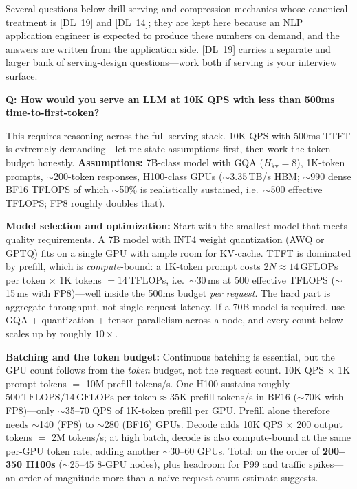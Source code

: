 Several questions below drill serving and compression mechanics whose canonical
treatment is [DL~19] and [DL~14]; they are kept here because an NLP application
engineer is expected to produce these numbers on demand, and the answers are written
from the application side.  [DL~19] carries a separate and larger bank of
serving-design questions---work both if serving is your interview surface.

\begin{interviewq}
\textbf{Q: How would you serve an LLM at 10K QPS with less than 500ms time-to-first-token?}

 \quad {} \quad \badgefreq{\freqhigh}

\stronganswer
This requires reasoning across the full serving stack.  10K QPS with 500ms TTFT is
extremely demanding---let me state assumptions first, then work the token budget
honestly.  \textbf{Assumptions:} 7B-class model with GQA ($H_{\text{kv}}{=}8$),
1K-token prompts, $\sim$200-token responses, H100-class GPUs ($\sim$3.35\,TB/s HBM;
$\sim$990 dense BF16 TFLOPS of which $\sim$50\% is realistically sustained, i.e.\
$\sim$500 effective TFLOPS; FP8 roughly doubles that).

\textbf{Model selection and optimization:}  Start with the smallest model that meets
quality requirements.  A 7B model with INT4 weight quantization (AWQ or GPTQ) fits on
a single GPU with ample room for KV-cache.  TTFT is dominated by prefill, which is
\emph{compute}-bound: a 1K-token prompt costs $2N \approx 14$\,GFLOPs per token
$\times$ 1K tokens $= 14$\,TFLOPs, i.e.\ $\sim$30\,ms at 500 effective TFLOPS
($\sim$15\,ms with FP8)---well inside the 500ms budget \emph{per request}.  The hard
part is aggregate throughput, not single-request latency.  If a 70B model is required,
use GQA + quantization + tensor parallelism across a node, and every count below
scales up by roughly $10\times$.

\textbf{Batching and the token budget:}  Continuous batching is essential, but the GPU
count follows from the \emph{token} budget, not the request count.  10K QPS $\times$
1K prompt tokens $=$ 10M prefill tokens/s.  One H100 sustains roughly
$500\,\text{TFLOPS} / 14\,\text{GFLOPs per token} \approx 35\text{K}$ prefill tokens/s
in BF16 ($\sim$70K with FP8)---only $\sim$35--70 QPS of 1K-token prefill per GPU.
Prefill alone therefore needs $\sim$140 (FP8) to $\sim$280 (BF16) GPUs.  Decode adds
10K QPS $\times$ 200 output tokens $=$ 2M tokens/s; at high batch, decode is also
compute-bound at the same per-GPU token rate, adding another $\sim$30--60 GPUs.
Total: on the order of \textbf{200--350 H100s} ($\sim$25--45 8-GPU nodes), plus
headroom for P99 and traffic spikes---an order of magnitude more than a naive
request-count estimate suggests.


\end{interviewq}
